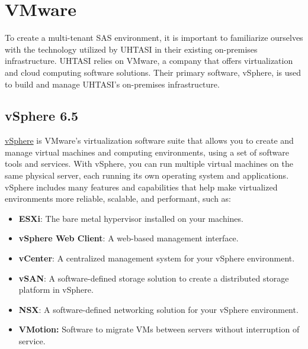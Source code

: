 \section{VMware} \label{section: VMware}

To create a multi-tenant SAS environment, it is important to familiarize ourselves with the technology utilized by UHTASI in their existing on-premises infrastructure. UHTASI relies on VMware, a company that offers virtualization and cloud computing software solutions. Their primary software, vSphere, is used to build and manage UHTASI's on-premises infrastructure.

\subsection{vSphere 6.5}
\href{https://www.vmware.com/products/vsphere.html}{vSphere} is VMware's virtualization software suite that allows you to create and manage virtual machines and computing environments, using a set of software tools and services. With vSphere, you can run multiple virtual machines on the same physical server, each running its own operating system and applications. vSphere includes many features and capabilities that help make virtualized environments more reliable, scalable, and performant, such as: 

\begin{itemize}
    \item \textbf{ESXi}: The bare metal hypervisor installed on your machines. 
    \item \textbf{vSphere Web Client}: A web-based management interface. 
    \item \textbf{vCenter}: A centralized management system for your vSphere environment.
    \item \textbf{vSAN}: A software-defined storage solution to create a distributed storage platform in vSphere.
    \item \textbf{NSX}: A software-defined networking solution for your vSphere environment.
    \item \textbf{VMotion:} Software to migrate VMs between servers without interruption of service.
\end{itemize}

